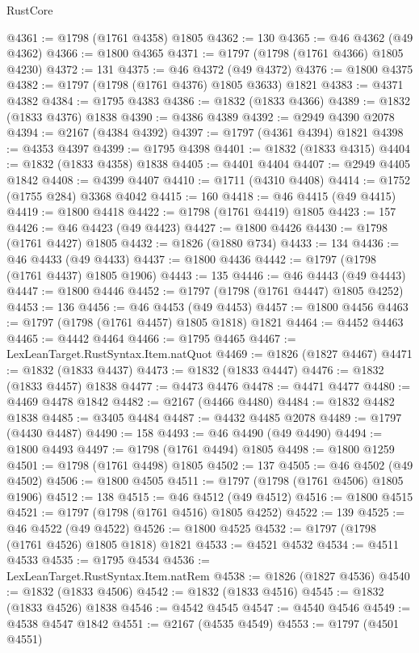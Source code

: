 \begin{lexlean}{RustCore}
\begin{coremodule}
@4361 := @1798 (@1761 @4358) @1805
@4362 := 130
@4365 := @46 @4362 (@49 @4362)
@4366 := @1800 @4365
@4371 := @1797 (@1798 (@1761 @4366) @1805 @4230)
@4372 := 131
@4375 := @46 @4372 (@49 @4372)
@4376 := @1800 @4375
@4382 := @1797 (@1798 (@1761 @4376) @1805 @3633) @1821
@4383 := @4371 @4382
@4384 := @1795 @4383
@4386 := @1832 (@1833 @4366)
@4389 := @1832 (@1833 @4376) @1838
@4390 := @4386 @4389
@4392 := @2949 @4390 @2078
@4394 := @2167 (@4384 @4392)
@4397 := @1797 (@4361 @4394) @1821
@4398 := @4353 @4397
@4399 := @1795 @4398
@4401 := @1832 (@1833 @4315)
@4404 := @1832 (@1833 @4358) @1838
@4405 := @4401 @4404
@4407 := @2949 @4405 @1842
@4408 := @4399 @4407
@4410 := @1711 (@4310 @4408)
@4414 := @1752 (@1755 @284) @3368 @4042
@4415 := 160
@4418 := @46 @4415 (@49 @4415)
@4419 := @1800 @4418
@4422 := @1798 (@1761 @4419) @1805
@4423 := 157
@4426 := @46 @4423 (@49 @4423)
@4427 := @1800 @4426
@4430 := @1798 (@1761 @4427) @1805
@4432 := @1826 (@1880 @734)
@4433 := 134
@4436 := @46 @4433 (@49 @4433)
@4437 := @1800 @4436
@4442 := @1797 (@1798 (@1761 @4437) @1805 @1906)
@4443 := 135
@4446 := @46 @4443 (@49 @4443)
@4447 := @1800 @4446
@4452 := @1797 (@1798 (@1761 @4447) @1805 @4252)
@4453 := 136
@4456 := @46 @4453 (@49 @4453)
@4457 := @1800 @4456
@4463 := @1797 (@1798 (@1761 @4457) @1805 @1818) @1821
@4464 := @4452 @4463
@4465 := @4442 @4464
@4466 := @1795 @4465
@4467 := LexLeanTarget.RustSyntax.Item.natQuot
@4469 := @1826 (@1827 @4467)
@4471 := @1832 (@1833 @4437)
@4473 := @1832 (@1833 @4447)
@4476 := @1832 (@1833 @4457) @1838
@4477 := @4473 @4476
@4478 := @4471 @4477
@4480 := @4469 @4478 @1842
@4482 := @2167 (@4466 @4480)
@4484 := @1832 @4482 @1838
@4485 := @3405 @4484
@4487 := @4432 @4485 @2078
@4489 := @1797 (@4430 @4487)
@4490 := 158
@4493 := @46 @4490 (@49 @4490)
@4494 := @1800 @4493
@4497 := @1798 (@1761 @4494) @1805
@4498 := @1800 @1259
@4501 := @1798 (@1761 @4498) @1805
@4502 := 137
@4505 := @46 @4502 (@49 @4502)
@4506 := @1800 @4505
@4511 := @1797 (@1798 (@1761 @4506) @1805 @1906)
@4512 := 138
@4515 := @46 @4512 (@49 @4512)
@4516 := @1800 @4515
@4521 := @1797 (@1798 (@1761 @4516) @1805 @4252)
@4522 := 139
@4525 := @46 @4522 (@49 @4522)
@4526 := @1800 @4525
@4532 := @1797 (@1798 (@1761 @4526) @1805 @1818) @1821
@4533 := @4521 @4532
@4534 := @4511 @4533
@4535 := @1795 @4534
@4536 := LexLeanTarget.RustSyntax.Item.natRem
@4538 := @1826 (@1827 @4536)
@4540 := @1832 (@1833 @4506)
@4542 := @1832 (@1833 @4516)
@4545 := @1832 (@1833 @4526) @1838
@4546 := @4542 @4545
@4547 := @4540 @4546
@4549 := @4538 @4547 @1842
@4551 := @2167 (@4535 @4549)
@4553 := @1797 (@4501 @4551)

\end{coremodule}
\end{lexlean}
